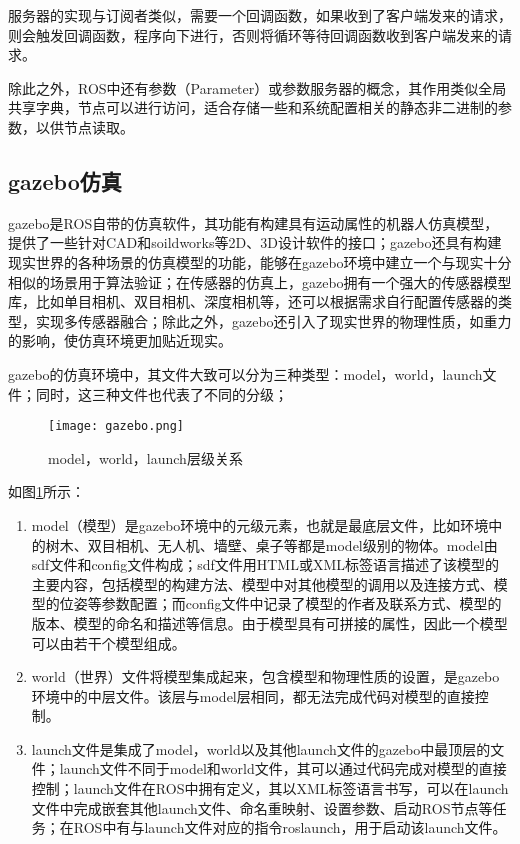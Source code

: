 服务器的实现与订阅者类似，需要一个回调函数，如果收到了客户端发来的请求，则会触发回调函数，程序向下进行，否则将循环等待回调函数收到客户端发来的请求。

除此之外，ROS中还有参数（Parameter）或参数服务器的概念，其作用类似全局共享字典，节点可以进行访问，适合存储一些和系统配置相关的静态非二进制的参数，以供节点读取。


\subsection{gazebo仿真} \label{2.1.2}
gazebo是ROS自带的仿真软件，其功能有构建具有运动属性的机器人仿真模型，提供了一些针对CAD和soildworks等2D、3D设计软件的接口；gazebo还具有构建现实世界的各种场景的仿真模型的功能，能够在gazebo环境中建立一个与现实十分相似的场景用于算法验证；在传感器的仿真上，gazebo拥有一个强大的传感器模型库，比如单目相机、双目相机、深度相机等，还可以根据需求自行配置传感器的类型，实现多传感器融合；除此之外，gazebo还引入了现实世界的物理性质，如重力的影响，使仿真环境更加贴近现实。

gazebo的仿真环境中，其文件大致可以分为三种类型：model，world，launch文件；同时，这三种文件也代表了不同的分级；

\begin{figure}[!ht]
	\centering
	\texttt{[image: gazebo.png]}
	\caption{model，world，launch层级关系} 
	\label{fig3}
\end{figure}

如图\ref{fig3}所示：
\begin{enumerate}
	\item model（模型）是gazebo环境中的元级元素，也就是最底层文件，比如环境中的树木、双目相机、无人机、墙壁、桌子等都是model级别的物体。model由sdf文件和config文件构成；sdf文件用HTML或XML标签语言描述了该模型的主要内容，包括模型的构建方法、模型中对其他模型的调用以及连接方式、模型的位姿等参数配置；而config文件中记录了模型的作者及联系方式、模型的版本、模型的命名和描述等信息。由于模型具有可拼接的属性，因此一个模型可以由若干个模型组成。
	\item
	world（世界）文件将模型集成起来，包含模型和物理性质的设置，是gazebo环境中的中层文件。该层与model层相同，都无法完成代码对模型的直接控制。
	\item 
	launch文件是集成了model，world以及其他launch文件的gazebo中最顶层的文件；launch文件不同于model和world文件，其可以通过代码完成对模型的直接控制；launch文件在ROS中拥有定义，其以XML标签语言书写，可以在launch文件中完成嵌套其他launch文件、命名重映射、设置参数、启动ROS节点等任务；在ROS中有与launch文件对应的指令roslaunch，用于启动该launch文件。
\end{enumerate}

